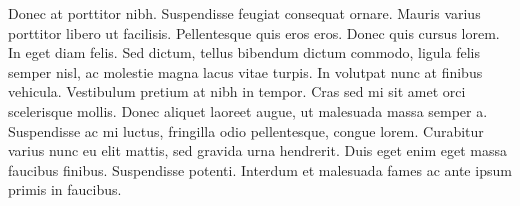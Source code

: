 \documentclass{jamk-thesis}
\begin{document}
Donec at porttitor nibh. Suspendisse feugiat consequat ornare.  Mauris varius
porttitor libero ut facilisis. Pellentesque quis eros eros. Donec quis cursus
lorem. In eget diam felis. Sed dictum, tellus bibendum dictum commodo, ligula
felis semper nisl, ac molestie magna lacus vitae turpis. In volutpat nunc at
finibus vehicula. Vestibulum pretium at nibh in tempor. Cras sed mi sit amet
orci scelerisque mollis. Donec aliquet laoreet augue, ut malesuada massa semper
a. Suspendisse ac mi luctus, fringilla odio pellentesque, congue lorem.
Curabitur varius nunc eu elit mattis, sed gravida urna hendrerit. Duis eget
enim eget massa faucibus finibus. Suspendisse potenti. Interdum et malesuada
fames ac ante ipsum primis in faucibus.

\newpage
\renewcommand{\baselinestretch}{1}
\printbibliography
{}
\end{document}
